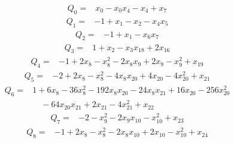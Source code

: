 \begingroup\small
\begin{equation*}\begin{split}
Q_{0}={}&x_{0} - x_{0} x_{4} - x_{4} + x_{7}
\end{split}\end{equation*}
\begin{equation*}\begin{split}
Q_{1}={}&-1 + x_{1} - x_{2} - x_{4} x_{5}
\end{split}\end{equation*}
\begin{equation*}\begin{split}
Q_{2}={}&-1 + x_{1} - x_{6} x_{7}
\end{split}\end{equation*}
\begin{equation*}\begin{split}
Q_{3}={}&1 + x_{2} - x_{3} x_{18} + 2x_{16}
\end{split}\end{equation*}
\begin{equation*}\begin{split}
Q_{4}={}&-1 + 2x_{8} - x_{8}^{2} - 2x_{8} x_{9} + 2x_{9} - x_{9}^{2} + x_{19}
\end{split}\end{equation*}
\begin{equation*}\begin{split}
Q_{5}={}&-2 + 2x_{8} - x_{8}^{2} - 4x_{8} x_{20} + 4x_{20} - 4x_{20}^{2} + x_{21}
\end{split}\end{equation*}
\begin{equation*}\begin{split}
Q_{6}={}&1 + 6x_{8} - 36x_{8}^{2} - 192x_{8} x_{20} - 24x_{8} x_{21} + 16x_{20} - 256x_{20}^{2}\\
&\quad -64x_{20} x_{21} + 2x_{21} - 4x_{21}^{2} + x_{22}
\end{split}\end{equation*}
\begin{equation*}\begin{split}
Q_{7}={}&-2 - x_{9}^{2} - 2x_{9} x_{10} - x_{10}^{2} + x_{23}
\end{split}\end{equation*}
\begin{equation*}\begin{split}
Q_{8}={}&-1 + 2x_{8} - x_{8}^{2} - 2x_{8} x_{10} + 2x_{10} - x_{10}^{2} + x_{24}
\end{split}\end{equation*}

